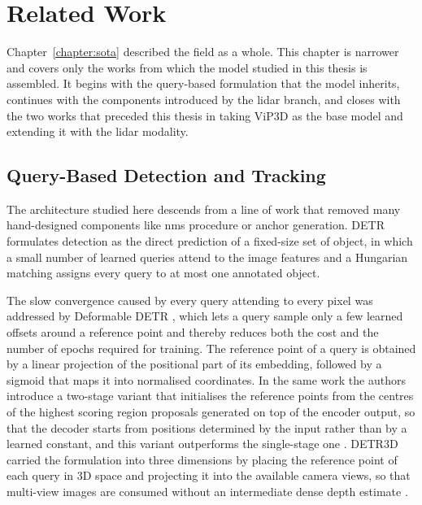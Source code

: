 \chapter{Related Work}
\label{chapter:related}



Chapter~\ref{chapter:sota} described the field as a whole. This chapter is narrower and covers only the
works from which the model studied in this thesis is assembled. It begins with the query-based formulation
that the model inherits, continues with the components introduced by the \ac{lidar} branch, and closes with
the two works that preceded this thesis in taking ViP3D as the base model and extending it with the
\ac{lidar} modality.


\section{Query-Based Detection and Tracking}
\label{sec:rw-queries}

The architecture studied here descends from a line of work that removed many hand-designed components
like \ac{nms} procedure or anchor generation. DETR \cite{Carion2020DETR} formulates detection as the 
direct prediction of a fixed-size set of object, in which a small number of learned queries attend to 
the image features and a Hungarian matching assigns every query to at most one annotated object.  

The slow convergence caused by every query attending to every pixel was addressed by Deformable DETR
\cite{Zhu2021DeformableDETR}, which lets a query sample only a few learned offsets around a reference
point and thereby reduces both the cost and the number of epochs required for training. The reference
point of a query is obtained by a linear projection of the positional part of its embedding, followed by
a sigmoid that maps it into normalised coordinates.
In the same work the authors introduce a two-stage variant that initialises the reference points from the
centres of the highest scoring region proposals generated on top of the encoder output, so that the decoder
starts from positions determined by the input rather than by a learned constant, and this variant
outperforms the single-stage one \cite{Zhu2021DeformableDETR}.
DETR3D carried the formulation into three dimensions by placing the reference point of each query in 3D space and projecting
it into the available camera views, so that multi-view images are consumed without an intermediate dense
depth estimate \cite{Wang2021DETR3D}.

